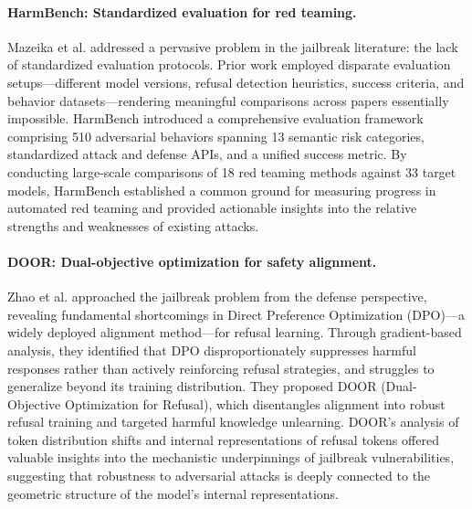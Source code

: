 ﻿\documentclass[lettersize,journal]{IEEEtran}
\begin{document}
\paragraph{HarmBench: Standardized evaluation for red teaming.} Mazeika et al. \cite{mazeika2024harmbench} addressed a pervasive problem in the jailbreak literature: the lack of standardized evaluation protocols. Prior work employed disparate evaluation setups---different model versions, refusal detection heuristics, success criteria, and behavior datasets---rendering meaningful comparisons across papers essentially impossible. HarmBench introduced a comprehensive evaluation framework comprising 510 adversarial behaviors spanning 13 semantic risk categories, standardized attack and defense APIs, and a unified success metric. By conducting large-scale comparisons of 18 red teaming methods against 33 target models, HarmBench established a common ground for measuring progress in automated red teaming and provided actionable insights into the relative strengths and weaknesses of existing attacks.

\paragraph{DOOR: Dual-objective optimization for safety alignment.} Zhao et al. \cite{zhao2025door} approached the jailbreak problem from the defense perspective, revealing fundamental shortcomings in Direct Preference Optimization (DPO)---a widely deployed alignment method---for refusal learning. Through gradient-based analysis, they identified that DPO disproportionately suppresses harmful responses rather than actively reinforcing refusal strategies, and struggles to generalize beyond its training distribution. They proposed DOOR (Dual-Objective Optimization for Refusal), which disentangles alignment into robust refusal training and targeted harmful knowledge unlearning. DOOR's analysis of token distribution shifts and internal representations of refusal tokens offered valuable insights into the mechanistic underpinnings of jailbreak vulnerabilities, suggesting that robustness to adversarial attacks is deeply connected to the geometric structure of the model's internal representations.
\end{document}
